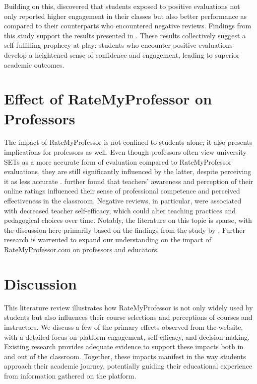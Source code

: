 \documentclass[twocolumn, doc,12pt]{apa7}
\begin{document}
Building on this, \textcite{reber_perceptual_2017} discovered that students exposed to positive evaluations not only reported higher engagement in their classes but also better performance as compared to their counterparts who encountered negative reviews. Findings from this study support the results presented in \textcite{boswell_effects_2020}. These results collectively suggest a self-fulfilling prophecy at play: students who encounter positive evaluations develop a heightened sense of confidence and engagement, leading to superior academic outcomes.

\section{Effect of RateMyProfessor on Professors}
The impact of RateMyProfessor is not confined to students alone; it also presents implications for professors as well. Even though professors often view university SETs as a more accurate form of evaluation compared to RateMyProfessor evaluations, they are still significantly influenced by the latter, despite perceiving it as less accurate \textcite{boswell_ratemyprofessors_2016}. \textcite{boswell_ratemyprofessors_2016} further found that teachers' awareness and perception of their online ratings influenced their sense of professional competence and perceived effectiveness in the classroom. Negative reviews, in particular, were associated with decreased teacher self-efficacy, which could alter teaching practices and pedagogical choices over time. Notably, the literature on this topic is sparse, with the discussion here primarily based on the findings from the study by \textcite{boswell_ratemyprofessors_2016}. Further research is warrented to expand our understanding on the impact of RateMyProfessor.com on professors and educators.

\section{Discussion}
This literature review illustrates how RateMyProfessor is not only widely used by students but also influences their course selections and perceptions of courses and instructors. We discuss a few of the primary effects observed from the website, with a detailed focus on 
platform engagement, self-efficacy, and decision-making. Existing research provides adequate evidence to support these impacts both in and out of the classroom. Together, these impacts manifest in the way students approach their academic journey, potentially guiding their educational experience from information gathered on the platform. 
\end{document}
